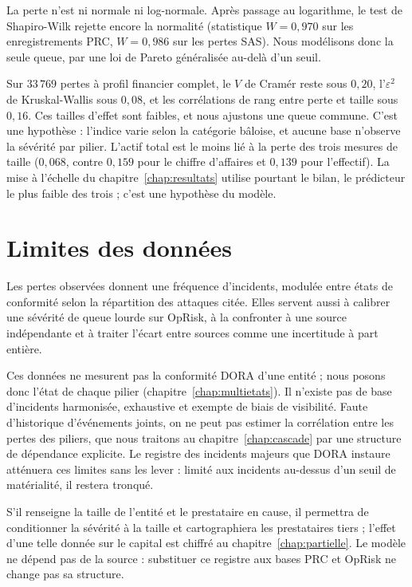 La perte n'est ni normale ni log-normale. Après passage au logarithme, le test de Shapiro-Wilk rejette encore la normalité (statistique $W=0{,}970$ sur les enregistrements PRC, $W=0{,}986$ sur les pertes SAS). Nous modélisons donc la seule queue, par une loi de Pareto généralisée au-delà d'un seuil.

Sur $33\,769$ pertes à profil financier complet, le $V$ de Cramér reste sous $0{,}20$,
l'$\varepsilon^2$ de Kruskal-Wallis sous $0{,}08$, et les corrélations de rang entre perte et taille
sous $0{,}16$. Ces tailles d'effet sont faibles, et nous ajustons une queue commune. C'est une hypothèse : l'indice varie selon la catégorie bâloise, et aucune base n'observe la sévérité par pilier. L'actif
total est le moins lié à la perte des trois mesures de taille ($0{,}068$, contre $0{,}159$ pour le
chiffre d'affaires et $0{,}139$ pour l'effectif). La mise à l'échelle du chapitre~\ref{chap:resultats} utilise pourtant le bilan, le prédicteur le plus faible des trois ; c'est une hypothèse du modèle.

\section{Limites des données}
\label{sec:portee-donnees}

Les pertes observées donnent une fréquence d'incidents, modulée entre états de conformité selon la répartition des attaques citée. Elles servent aussi à calibrer une
sévérité de queue lourde sur OpRisk, à la confronter à une source indépendante et à traiter l'écart
entre sources comme une incertitude à part entière.

Ces données ne mesurent pas la conformité DORA d'une entité ; nous posons donc l'état de chaque pilier (chapitre~\ref{chap:multietats}). Il
n'existe pas de base d'incidents harmonisée, exhaustive et exempte de biais de visibilité. Faute
d'historique d'événements joints, on ne peut pas estimer la corrélation entre les pertes des piliers, que
nous traitons au chapitre~\ref{chap:cascade} par une structure de dépendance explicite. Le registre des incidents majeurs que DORA instaure atténuera ces limites sans les lever : limité aux incidents au-dessus d'un seuil de matérialité, il restera tronqué.

S'il renseigne la taille de l'entité et le prestataire en cause, il permettra de conditionner la sévérité à la taille et cartographiera les prestataires tiers ; l'effet d'une telle donnée sur le capital est chiffré au chapitre~\ref{chap:partielle}. Le modèle ne dépend pas de la source : substituer ce registre aux bases PRC et OpRisk ne change pas sa structure.


